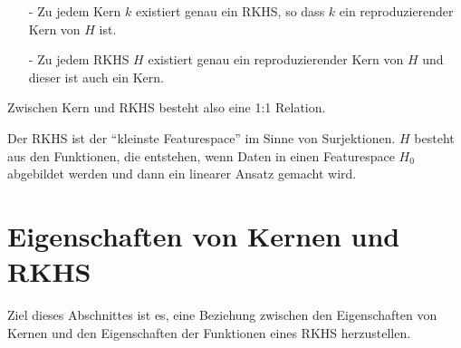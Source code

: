 \begin{bem*}[Interpretation.]
\begin{itemize}
  \item[-] Zu jedem Kern $k$ existiert genau ein RKHS, so dass $k$ ein
  reproduzierender Kern von $H$ ist.
  \item[-] Zu jedem RKHS $H$ existiert genau ein reproduzierender Kern von $H$
  und dieser ist auch ein Kern.
\end{itemize}
\noindent
Zwischen Kern und RKHS besteht also eine 1:1 Relation.

Der RKHS ist der "`kleinste Featurespace"' im Sinne von Surjektionen. $H$
besteht aus den Funktionen, die entstehen, wenn Daten in einen Featurespace $H_0$
abgebildet werden und dann ein linearer Ansatz gemacht wird.\maphere
\end{bem*}

\section{Eigenschaften von Kernen und RKHS}

Ziel dieses Abschnittes ist es, eine Beziehung zwischen den Eigenschaften von
Kernen und den Eigenschaften der Funktionen eines RKHS herzustellen.

